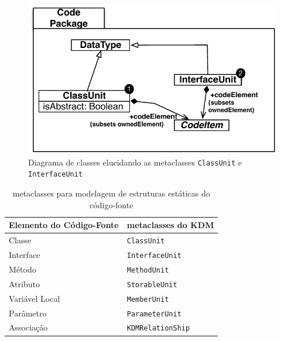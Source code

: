\begin{figure}[!ht]
	\centering
	\includegraphics[scale=0.8]{images/ClassUnit_InterfaceUnit}
	\caption{Diagrama de classes elucidando as metaclasses \texttt{ClassUnit} e \texttt{InterfaceUnit}}
	\label{fig:classUnit_e_InterfaceUnit}
\end{figure}


\begin{table}[h]
\centering
\caption{metaclasses para modelagem de estruturas estáticas do código-fonte}
\label{tab:meta_classes_pacoteCODE}
\begin{tabular}{|l|l|}
\hline
Elemento do Código-Fonte & metaclasses do KDM \\ \hline
Classe                   & \texttt{ClassUnit}           \\ \hline
Interface                & \texttt{InterfaceUnit}       \\ \hline
Método                   & \texttt{MethodUnit}          \\ \hline
Atributo                 & \texttt{StorableUnit}        \\ \hline
Variável Local           & \texttt{MemberUnit}          \\ \hline
Parâmetro                & \texttt{ParameterUnit}       \\ \hline
Associação               & \texttt{KDMRelationShip}     \\ \hline
\end{tabular}
\end{table}

